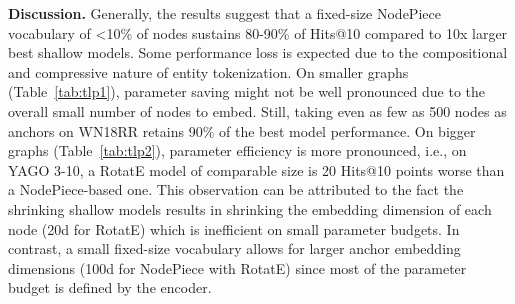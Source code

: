 \documentclass{article} \usepackage{iclr2022_conference,times}
\begin{document}
\textbf{Discussion.}
Generally, the results suggest that a fixed-size NodePiece vocabulary of <10\% of nodes sustains 80-90\% of Hits@10 compared to 10x larger best shallow models.
Some performance loss is expected due to the compositional and compressive nature of entity tokenization.
On smaller graphs (Table~\ref{tab:tlp1}), parameter saving might not be well pronounced due to the overall small number of nodes to embed.
Still, taking even as few as 500 nodes as anchors on WN18RR retains 90\% of the best model performance. 
On bigger graphs (Table~\ref{tab:tlp2}), parameter efficiency is more pronounced, i.e., on YAGO 3-10, a RotatE model of comparable size is 20 Hits@10 points worse than a NodePiece-based one. 
This observation can be attributed to the fact the shrinking shallow models results in shrinking the embedding dimension of each node (20d for RotatE) which is inefficient on small parameter budgets. 
In contrast, a small fixed-size vocabulary allows for larger anchor embedding dimensions (100d for NodePiece with RotatE) since most of the parameter budget is defined by the encoder.

\begin{table}[t]
\centering
\caption{Transductive link prediction on smaller KGs.  results taken from~\citep{DBLP:conf/iclr/SunDNT19}.  denotes vocabulary size (anchors + relations), \#P is a total parameter count (millions). \% denotes the Hits@10 ratio based on the strongest model.}
\label{tab:tlp1}
\end{table}
\end{document}

